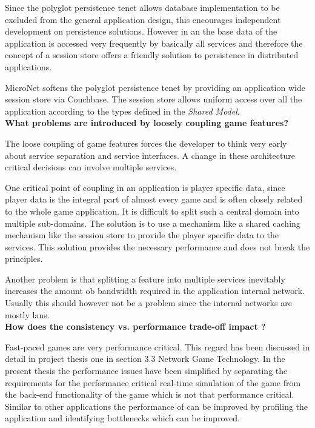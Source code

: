 Since the polyglot persistence tenet allows database implementation to be
excluded from the general application design, this encourages independent
development on persistence solutions. However in an \og{} the base data of the
application is accessed very frequently by basically all services and therefore
the concept of a session store offers a \ms{} friendly solution to persistence
in distributed applications.

MicroNet softens the polyglot persistence tenet by providing an application wide
session store via Couchbase. The session store allows uniform access over all
the application according to the types defined in the \textit{Shared Model}.\\

\noindent
\textbf{What problems are introduced by loosely coupling game features?}

The loose coupling of game features forces the developer to think very early
about service separation and service interfaces. A change in these architecture
critical decisions can involve multiple services.

One critical point of coupling in an \og{} application is player specific data,
since player data is the integral part of almost every game and is often closely
related to the whole game application. It is difficult to split such a central
domain into multiple sub-domains. The solution is to use a mechanism like a
shared caching mechanism like the session store to provide the player specific
data to the services. This solution provides the necessary performance and does
not break the \ms{} principles.

Another problem is that splitting a feature into multiple services inevitably
increases the amount ob bandwidth required in the application internal network.
Usually this should however not be a problem since the internal networks are
mostly \glspl{lan}.\\

\noindent
\textbf{How does the consistency vs. performance trade-off impact \ogs{}?}

Fast-paced games are very performance critical. This regard has been discussed
in detail in project thesis one \cite{biedermann2015project1} in section 3.3
Network Game Technology. In the present thesis the performance issues have been
simplified by separating the requirements for the performance critical real-time
simulation of the game from the back-end functionality of the game which is not
that performance critical. Similar to other applications the performance of
\ogs{} can be improved by profiling the application and identifying bottlenecks
which can be improved.

